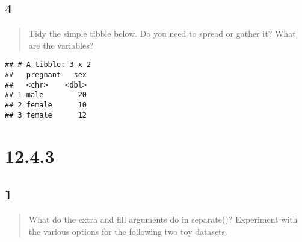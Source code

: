 \documentclass[]{ltjsarticle}
\newenvironment{Shaded}{\begin{snugshade}}{\end{snugshade}}
\newcommand{\DataTypeTok}[1]{\textcolor[rgb]{0.13,0.29,0.53}{#1}}
\newcommand{\DecValTok}[1]{\textcolor[rgb]{0.00,0.00,0.81}{#1}}
\newcommand{\KeywordTok}[1]{\textcolor[rgb]{0.13,0.29,0.53}{\textbf{#1}}}
\newcommand{\NormalTok}[1]{#1}
\newcommand{\OperatorTok}[1]{\textcolor[rgb]{0.81,0.36,0.00}{\textbf{#1}}}
\newcommand{\OtherTok}[1]{\textcolor[rgb]{0.56,0.35,0.01}{#1}}
\newcommand{\StringTok}[1]{\textcolor[rgb]{0.31,0.60,0.02}{#1}}
\begin{document}
\hypertarget{section-8}{%
\subsection{4}\label{section-8}}

\begin{quote}
Tidy the simple tibble below. Do you need to spread or gather it? What
are the variables?
\end{quote}

\begin{Shaded}
\end{Shaded}

\begin{verbatim}
## # A tibble: 3 x 2
##   pregnant   sex
##   <chr>    <dbl>
## 1 male        20
## 2 female      10
## 3 female      12
\end{verbatim}

\hypertarget{section-9}{%
\section{12.4.3}\label{section-9}}

\hypertarget{section-10}{%
\subsection{1}\label{section-10}}

\begin{quote}
What do the extra and fill arguments do in separate()? Experiment with
the various options for the following two toy datasets.
\end{quote}

\begin{Shaded}
\end{Shaded}
\end{document}
